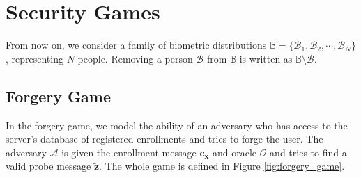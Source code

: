 
\section*{Security Games}

From now on, we consider a family of biometric distributions $\mathbb{B} = \{ \mathcal{B}_1, \mathcal{B}_2, \cdots, \mathcal{B}_N \}$, representing $N$ people. Removing a person $\mathcal{B}$ from $\mathbb{B}$ is written as $\mathbb{B} \setminus \mathcal{B}$.

\subsection*{Forgery Game}
\label{sec:forgery_game}

In the forgery game, we model the ability of an adversary who has access to the server's database of registered enrollments and tries to forge the user. The adversary $\mathcal{A}$ is given the enrollment message $\mathbf{c_x}$ and oracle $\mathcal{O}$ and tries to find a valid probe message $\mathbf{\tilde{z}}$. The whole game is defined in Figure \ref{fig:forgery_game}.

